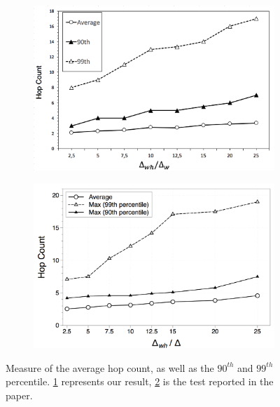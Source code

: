 \begin{figure}
\centering
\begin{subfigure}{.5\textwidth}
  \centering
  \includegraphics[keepaspectratio=true, width=1\linewidth]{images/average_hop_count}
  \caption{}
  \label{fig:my_average_hop_count}
\end{subfigure}%
\begin{subfigure}{.5\textwidth}
  \centering
  \includegraphics[keepaspectratio=true, width=1\linewidth]{images/paper_average_hop_count}
  \caption{}
  \label{fig:paper_average_hop_count}
\end{subfigure}
\caption{Measure of the average hop count, as well as the $90^{th}$ and $99^{th}$ percentile. \ref{fig:my_average_hop_count} represents our result, \ref{fig:paper_average_hop_count} is the test reported in the paper.}
\label{fig:freshness}
\end{figure}



